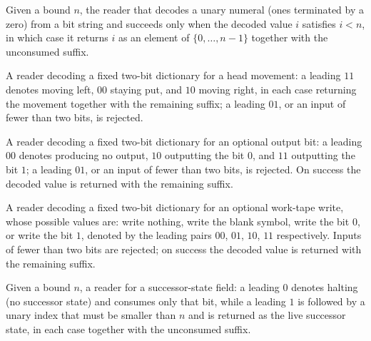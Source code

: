 \begin{definition}
\label{Turing.codeReadFin}
\leanok
{}
Given a bound $n$, the reader that decodes a unary numeral (ones terminated by
a zero) from a bit string and succeeds only when the decoded value $i$
satisfies $i < n$, in which case it returns $i$ as an element of
$\{0, \dots, n-1\}$ together with the unconsumed suffix.
\end{definition}

\begin{definition}
\label{Turing.codeReadSign}
\leanok
A reader decoding a fixed two-bit dictionary for a head movement: a leading
$11$ denotes moving left, $00$ staying put, and $10$ moving right, in each case
returning the movement together with the remaining suffix; a leading $01$, or
an input of fewer than two bits, is rejected.
\end{definition}

\begin{definition}
\label{Turing.codeReadOutput}
\leanok
A reader decoding a fixed two-bit dictionary for an optional output bit: a
leading $00$ denotes producing no output, $10$ outputting the bit $0$, and $11$
outputting the bit $1$; a leading $01$, or an input of fewer than two bits, is
rejected.  On success the decoded value is returned with the remaining suffix.
\end{definition}

\begin{definition}
\label{Turing.codeReadWrite}
\leanok
A reader decoding a fixed two-bit dictionary for an optional work-tape write,
whose possible values are: write nothing, write the blank symbol, write the bit
$0$, or write the bit $1$, denoted by the leading pairs $00$, $01$, $10$, $11$
respectively.  Inputs of fewer than two bits are rejected; on success the
decoded value is returned with the remaining suffix.
\end{definition}

\begin{definition}
\label{Turing.codeReadState}
\leanok
{}
Given a bound $n$, a reader for a successor-state field: a leading $0$ denotes
halting (no successor state) and consumes only that bit, while a leading $1$ is
followed by a unary index that must be smaller than $n$ and is returned as the
live successor state, in each case together with the unconsumed suffix.
\end{definition}

